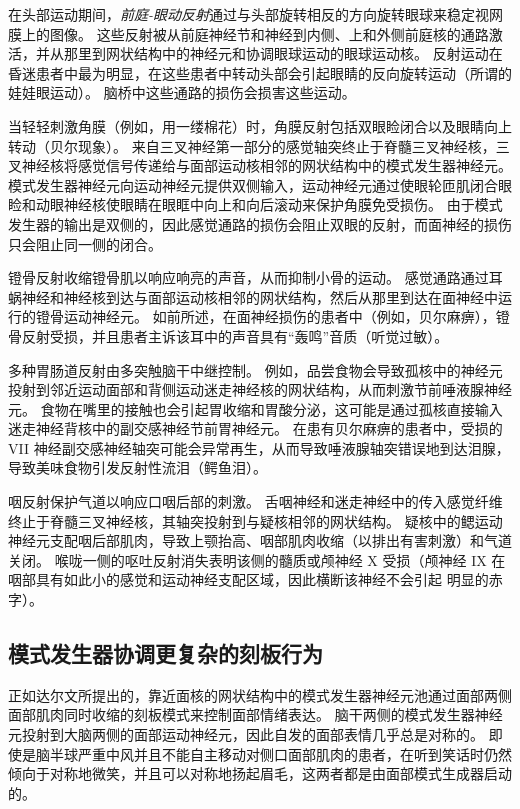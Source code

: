 在头部运动期间，\textit{前庭-眼动反射}通过与头部旋转相反的方向旋转眼球来稳定视网膜上的图像。
这些反射被从前庭神经节和神经到内侧、上和外侧前庭核的通路激活，并从那里到网状结构中的神经元和协调眼球运动的眼球运动核。
反射运动在昏迷患者中最为明显，在这些患者中转动头部会引起眼睛的反向旋转运动（所谓的娃娃眼运动）。
脑桥中这些通路的损伤会损害这些运动。


当轻轻刺激角膜（例如，用一缕棉花）时，角膜反射包括双眼睑闭合以及眼睛向上转动（贝尔现象）。
来自三叉神经第一部分的感觉轴突终止于脊髓三叉神经核，三叉神经核将感觉信号传递给与面部运动核相邻的网状结构中的模式发生器神经元。
模式发生器神经元向运动神经元提供双侧输入，运动神经元通过使眼轮匝肌闭合眼睑和动眼神经核使眼睛在眼眶中向上和向后滚动来保护角膜免受损伤。
由于模式发生器的输出是双侧的，因此感觉通路的损伤会阻止双眼的反射，而面神经的损伤只会阻止同一侧的闭合。


镫骨反射收缩镫骨肌以响应响亮的声音，从而抑制小骨的运动。
感觉通路通过耳蜗神经和神经核到达与面部运动核相邻的网状结构，然后从那里到达在面神经中运行的镫骨运动神经元。
如前所述，在面神经损伤的患者中（例如，贝尔麻痹），镫骨反射受损，并且患者主诉该耳中的声音具有“轰鸣”音质（听觉过敏）。


多种胃肠道反射由多突触脑干中继控制。
例如，品尝食物会导致孤核中的神经元投射到邻近运动面部和背侧运动迷走神经核的网状结构，从而刺激节前唾液腺神经元。
食物在嘴里的接触也会引起胃收缩和胃酸分泌，这可能是通过孤核直接输入迷走神经背核中的副交感神经节前胃神经元。
在患有贝尔麻痹的患者中，受损的 VII 神经副交感神经轴突可能会异常再生，从而导致唾液腺轴突错误地到达泪腺，导致美味食物引发反射性流泪（鳄鱼泪）。


咽反射保护气道以响应口咽后部的刺激。
舌咽神经和迷走神经中的传入感觉纤维终止于脊髓三叉神经核，其轴突投射到与疑核相邻的网状结构。
疑核中的鳃运动神经元支配咽后部肌肉，导致上颚抬高、咽部肌肉收缩（以排出有害刺激）和气道关闭。
喉咙一侧的呕吐反射消失表明该侧的髓质或颅神经 X 受损（颅神经 IX 在咽部具有如此小的感觉和运动神经支配区域，因此横断该神经不会引起 明显的赤字）。



\subsection{模式发生器协调更复杂的刻板行为}

正如达尔文所提出的，靠近面核的网状结构中的模式发生器神经元池通过面部两侧面部肌肉同时收缩的刻板模式来控制面部情绪表达。
脑干两侧的模式发生器神经元投射到大脑两侧的面部运动神经元，因此自发的面部表情几乎总是对称的。
即使是脑半球严重中风并且不能自主移动对侧口面部肌肉的患者，在听到笑话时仍然倾向于对称地微笑，并且可以对称地扬起眉毛，这两者都是由面部模式生成器启动的。


